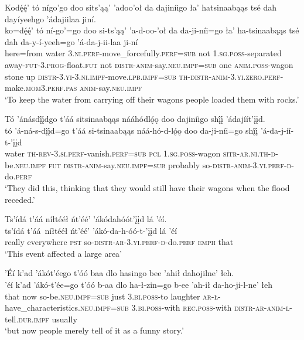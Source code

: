 \ea\label{ex:text6-13-29}
Kodę́ę́’ tó nígo’go doo sits’ąą’ ’adoo’oł da dajiníigo ła’ hatsinaabąąs tsé dah dayíyeehgo ’ádajiilaa jiní.\\
\gll ko=dę́ę́’	tó	ní-go’=go	doo	si-ts’ąą’	’a-d-oo-’oł	da	da-ji-níi=go	ła’	ha-tsinaabąąs	tsé	dah	da-y-í-yeeh=go	’á-da-j-ii-laa	ji-ní\\
     here=from	water	3.\textsc{ni}.\textsc{perf}-move\_forcefully.\textsc{perf}=\textsc{sub}	not	1.\textsc{sg}.\textsc{poss}-separated	away-\textsc{fut}-3.\textsc{prog}-float.\textsc{fut}	not	\textsc{distr}-\textsc{anim}-say.\textsc{neu}.\textsc{impf}=\textsc{sub}	one	\textsc{anim}.\textsc{poss}-wagon	stone	up	\textsc{distr}-3.\textsc{yi}-3.\textsc{ni}.\textsc{impf}-move.\textsc{lpb}.\textsc{impf}=\textsc{sub}	\textsc{th}-\textsc{distr}-\textsc{anim}-3.\textsc{yi}.\textsc{zero}.\textsc{perf}-make.\textsc{mom}3.\textsc{perf}.\textsc{pas}	\textsc{anim}-say.\textsc{neu}.\textsc{impf}\\
\glt `To keep the water from carrying off their wagons people loaded them with rocks.'
\z

\ea\label{ex:text6-13-30}
Tó ’ánásdį́į́dgo t’áá sitsinaabąąs nááhódlǫ́ǫ doo dajiníigo shį́į́ ’ádajíít’įįd.\\
\gll tó	’á-ná-s-dį́į́d=go	t’áá	si-tsinaabąąs	náá-hó-d-lǫ́ǫ	doo	da-ji-níi=go	shį́į́	’á-da-j-íí-t-’įįd\\
     water	\textsc{th}-\textsc{rev}-3.\textsc{si}.\textsc{perf}-vanish.\textsc{perf}=\textsc{sub}	\textsc{pcl}	1.\textsc{sg}.\textsc{poss}-wagon	\textsc{sitr}-\textsc{ar}.\textsc{ni}.\textsc{th}-\textsc{d}-be.\textsc{neu}.\textsc{impf}	\textsc{fut}	\textsc{distr}-\textsc{anim}-say.\textsc{neu}.\textsc{impf}=\textsc{sub}	probably	so-\textsc{distr}-\textsc{anim}-3.\textsc{yi}.\textsc{perf}-\textsc{d}-do.\textsc{perf}\\
\glt `They did this, thinking that they would still have their wagons when the flood receded.'
\z

\ea\label{ex:text6-13-31}
Ts’ídá t’áá níłtééł ńt’éé’ ’ákódahóót’įįd lá ’éí.\\
\gll ts’ídá	t’áá~{níłtééł}	ńt’éé’	’ákó-da-h-óó-t-’įįd	lá	’éí\\
     really	everywhere	\textsc{pst}	so-\textsc{distr}-\textsc{ar}-3.\textsc{yi}.\textsc{perf}-\textsc{d}-do.\textsc{perf}	\textsc{emph}	that\\
\glt `This event affected a large area'
\z

\ea\label{ex:text6-13-32}
’Éí k’ad ’ákót’éego t’óó baa dlo hasingo bee ’ahił dahojilne’ łeh.\\
\gll ’éí	k’ad	’ákó-t’ée=go	t’óó	b-aa	dlo ha-ł-zin=go	b-ee	’ah-ił	da-ho-ji-l-ne’	łeh\\
     that	now	so-be.\textsc{neu}.\textsc{impf}=\textsc{sub}	just	3.\textsc{bi}.\textsc{poss}-to	laughter \textsc{ar}-\textsc{ł}-have\_characteristics.\textsc{neu}.\textsc{impf}=\textsc{sub}	3.\textsc{bi}.\textsc{poss}-with	\textsc{rec}.\textsc{poss}-with	\textsc{distr}-\textsc{ar}-\textsc{anim}-\textsc{l}-tell.\textsc{dur}.\textsc{impf}	usually\\
\glt `but now people merely tell of it as a funny story.'
\z

